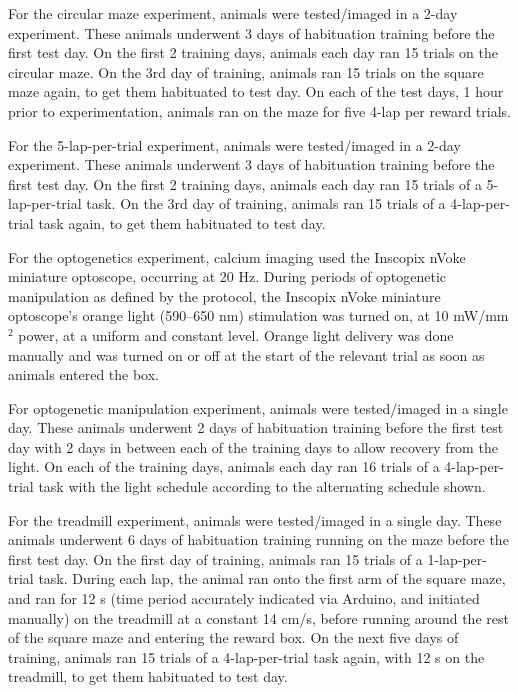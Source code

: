 For the circular maze experiment, animals were tested/imaged in a 2-day experiment. These animals underwent 3 days of habituation training before the first test day. On the first 2 training days, animals each day ran 15 trials on the circular maze. On the 3rd day of training, animals ran 15 trials on the square maze again, to get them habituated to test day. On each of the test days, 1 hour prior to experimentation, animals ran on the maze for five 4-lap per reward trials.

For the 5-lap-per-trial experiment, animals were tested/imaged in a 2-day experiment. These animals underwent 3 days of habituation training before the first test day. On the first 2 training days, animals each day ran 15 trials of a 5-lap-per-trial task. On the 3rd day of training, animals ran 15 trials of a 4-lap-per-trial task again, to get them habituated to test day.

For the optogenetics experiment, calcium imaging used the Inscopix nVoke miniature optoscope, occurring at 20 Hz. During periods of optogenetic manipulation as defined by the protocol, the Inscopix nVoke miniature optoscope's orange light (590--650 nm) stimulation was turned on, at 10 mW/mm$^2$ power, at a uniform and constant level. Orange light delivery was done manually and was turned on or off at the start of the relevant trial as soon as animals entered the box.

For optogenetic manipulation experiment, animals were tested/imaged in a single day. These animals underwent 2 days of habituation training before the first test day with 2 days in between each of the training days to allow recovery from the light. On each of the training days, animals each day ran 16 trials of a 4-lap-per-trial task with the light schedule according to the alternating schedule shown.

For the treadmill experiment, animals were tested/imaged in a single day. These animals underwent 6 days of habituation training running on the maze before the first test day. On the first day of training, animals ran 15 trials of a 1-lap-per-trial task. During each lap, the animal ran onto the first arm of the square maze, and ran for 12 s (time period accurately indicated via Arduino, and initiated manually) on the treadmill at a constant 14 cm/s, before running around the rest of the square maze and entering the reward box. On the next five days of training, animals ran 15 trials of a 4-lap-per-trial task again, with 12 s on the treadmill, to get them habituated to test day.

